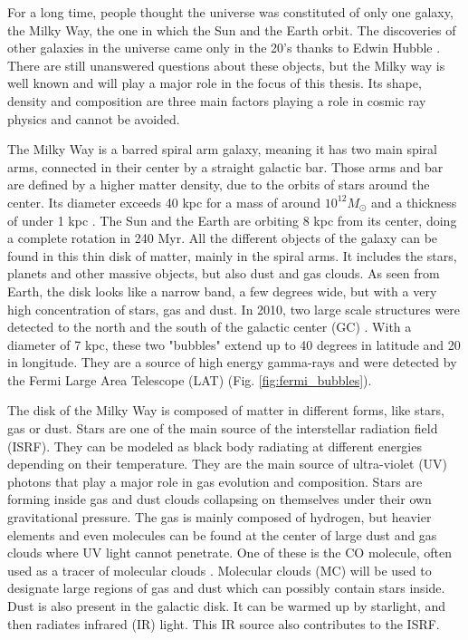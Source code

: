 For a long time, people thought the universe was constituted of only one galaxy, the Milky Way, the one in which the Sun and the Earth orbit. The discoveries of other galaxies in the universe came only in the 20's thanks to Edwin Hubble . There are still unanswered questions about these objects, but the Milky way is well known and will play a major role in the focus of this thesis. Its shape, density and composition are three main factors playing a role in cosmic ray physics and cannot be avoided.

The Milky Way is a barred spiral arm galaxy, meaning it has two main spiral arms, connected in their center by a straight galactic bar. Those arms and bar are defined by a higher matter density, due to the orbits of stars around the center. Its diameter exceeds 40 kpc for a mass of around $10^{12} M_\odot$ and a thickness of under 1 kpc . The Sun and the Earth are orbiting 8 kpc from its center, doing a complete rotation in 240 Myr.
All the different objects of the galaxy can be found in this thin disk of matter, mainly in the spiral arms. It includes the stars, planets and other massive objects, but also dust and gas clouds. As seen from Earth, the disk looks like a narrow band, a few degrees wide, but with a very high concentration of stars, gas and dust.
In 2010, two large scale structures were detected to the north and the south of the galactic center (GC) . With a diameter of 7 kpc, these two "bubbles" extend up to 40 degrees in latitude and 20 in longitude. They are a source of high energy gamma-rays and were detected by the Fermi Large Area Telescope (LAT) (Fig. \ref{fig:fermi_bubbles}).

The disk of the Milky Way is composed of matter in different forms, like stars, gas or dust. Stars are one of the main source of the interstellar radiation field (ISRF). They can be modeled as black body radiating at different energies depending on their temperature. They are the main source of ultra-violet (UV) photons that play a major role in gas evolution and composition. Stars are forming inside gas and dust clouds collapsing on themselves under their own gravitational pressure.
The gas is mainly composed of hydrogen, but heavier elements and even molecules can be found at the center of large dust and gas clouds where UV light cannot penetrate. One of these is the CO molecule, often used as a tracer of molecular clouds . Molecular clouds (MC) will be used to designate large regions of gas and dust which can possibly contain stars inside.
 Dust is also present in the galactic disk. It can be warmed up by starlight, and then radiates infrared (IR) light. This IR source also contributes to the ISRF.

